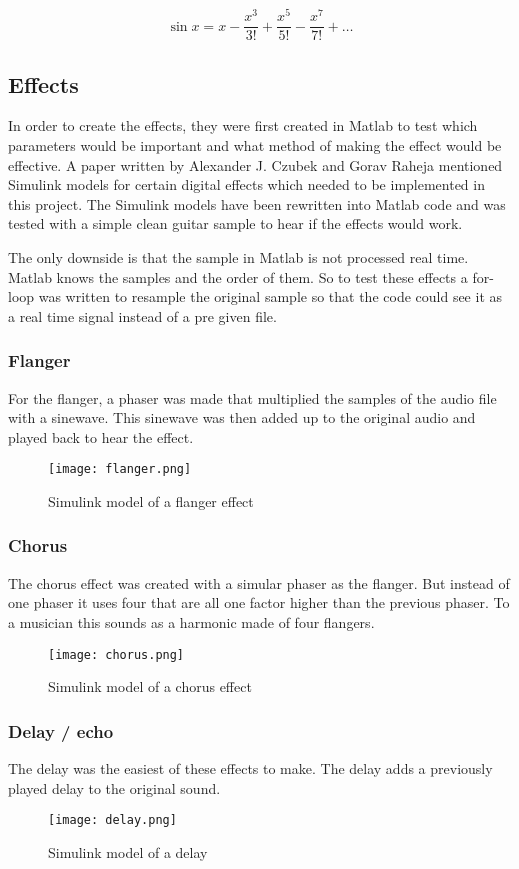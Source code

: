 \begin{equation}
    \sin x = x - \frac{x^3}{3!} + \frac{x^5}{5!} - \frac{x^7}{7!} + \dots
    \label{eq:taylor-series-sin}
\end{equation}

\subsection{Effects}
In order to create the effects, they were first created in Matlab to test which parameters would be important and what method of making the effect would be effective. 
\noindent
A paper \cite{Guitar_Effects_Processor_Using_DSP} written by Alexander J. Czubek and Gorav Raheja mentioned Simulink models for certain digital effects which needed to be implemented in this project. The Simulink models have been rewritten into Matlab code and was tested with a simple clean guitar sample to hear if the effects would work. 
\par
\noindent
The only downside is that the sample in Matlab is not processed real time. Matlab knows the samples and the order of them. So to test these effects a for-loop was written to resample the original sample so that the code could see it as a real time signal instead of a pre given file.

\subsubsection{Flanger}
For the flanger, a phaser was made that multiplied the samples of the audio file with a sinewave. This sinewave was then added up to the original audio and played back to hear the effect.
\begin{figure}[ht]
    \texttt{[image: flanger.png]}
    \caption{Simulink model of a flanger effect}
    \label{fig:flangersimulink}
\end{figure}

\subsubsection{Chorus}
The chorus effect was created with a simular phaser as the flanger. But instead of one phaser it uses four that are all one factor higher than the previous phaser. To a musician this sounds as a harmonic made of four flangers. 

\begin{figure}[ht]
    \texttt{[image: chorus.png]}
    \caption{Simulink model of a chorus effect}
    \label{fig:chorussimulink}
\end{figure}

\subsubsection{Delay / echo}
The delay was the easiest of these effects to make. The delay adds a previously played delay to the original sound. 

\begin{figure}[ht]
    \texttt{[image: delay.png]}
    \caption{Simulink model of a delay}
    \label{fig:delaysimulink}
\end{figure}

\newpage
